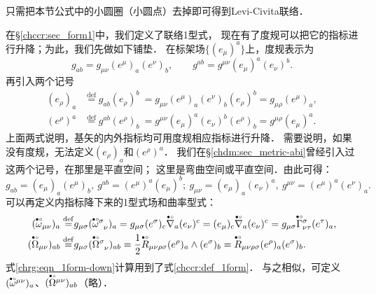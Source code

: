 只需把本节公式中的小圆圈（小圆点）去掉即可得到Levi-Civita联络．



在\S\ref{chccr:sec_form1}中，我们定义了联络1型式，
现在有了度规可以把它的指标进行升降；为此，我们先做如下铺垫．
在标架场$\{(e_\mu)^a\}$上，度规表示为
\begin{equation}
	g_{ab}=g_{\mu\nu}(e^\mu)_a (e^\nu)_b, \qquad
	g^{ab}=g^{\mu\nu}(e_\mu)^a (e_\nu)^b.
\end{equation}
再引入两个记号
\begin{align}
	(e_\rho)_a &\overset{\mathrm {def}}{=} g_{ab}(e_\rho)^b \
	= g_{\mu\nu}(e^\mu)_a (e^\nu)_b (e_\rho)^b
	= g_{\mu\rho}(e^\mu)_a, \\
	(e^\rho)^a &\overset{\mathrm {def}}{=} g^{ab}(e^\rho)_b \
	= g^{\mu\nu}(e_\mu)^a (e_\nu)^b(e^\rho)_b
	= g^{\mu\rho}(e_\mu)^a .
\end{align}
上面两式说明，基矢的内外指标均可用度规相应指标进行升降．
需要说明，如果没有度规，无法定义$(e_\rho)_a$和$(e^\rho)^a$．
我们在\S\ref{chdm:sec_metric-abi}曾经引入过这两个记号，在那里是平直空间；
这里是弯曲空间或平直空间．由此可得：
\begin{equation}
	g_{ab}=(e_\mu)_a (e^\mu)_b, \  g^{ab}=(e^\mu)^a (e_\mu)^b ; \
	g_{\mu\nu}=(e_\mu)_a (e_\nu)^a, \  g^{\mu\nu}=(e^\mu)^a (e^\nu)_a .
\end{equation}
可以再定义内指标降下来的1型式场和曲率型式：
\begin{align}
	(\oversetmy{\bullet\circ}{\omega} _{\mu\nu})_{a} \overset{\mathrm {def}}{=}&
	g_{\mu\sigma} (\oversetmy{\bullet\circ}{\omega}^{\sigma}_{\hphantom{\sigma}\nu})_{a}
	= g_{\mu\sigma} (e^\sigma)_c \oversetmy{\bullet\circ}{\nabla}_a (e_\nu)^c
	= (e_\mu)_c \oversetmy{\bullet\circ}{\nabla}_a (e_\nu)^c
	= g_{\mu\sigma}\oversetmy{\bullet\circ}{\Gamma}^{\sigma}_{\nu\tau} (e^\tau)_a , \label{chrg:eqn_1form-down}\\
	(\oversetmy{\bullet\circ}{\Omega}_{\mu\nu} )_{ab} \overset{\mathrm {def}}{=}& 
	g_{\mu\sigma}(\oversetmy{\bullet\circ}{\Omega}_{\hphantom{\sigma} \nu} ^{\sigma})_{ab}
	= \frac{1}{2} \oversetmy{\bullet\circ}{R}_{\mu \nu \rho\sigma}  (e^\rho)_a \wedge (e^\sigma)_b
	= \oversetmy{\bullet\circ}{R}_{\mu \nu \rho\sigma} (e^\rho)_a (e^\sigma)_b . \label{chrg:eqn_Cform-down}
\end{align}
式\eqref{chrg:eqn_1form-down}计算用到了式\eqref{chccr:def_1form}．
与之相似，可定义$(\oversetmy{\bullet\circ}{\omega} ^{\mu\nu})_{a}$、$(\oversetmy{\bullet\circ}{\Omega}^{\mu\nu} )_{ab}$（略）．



